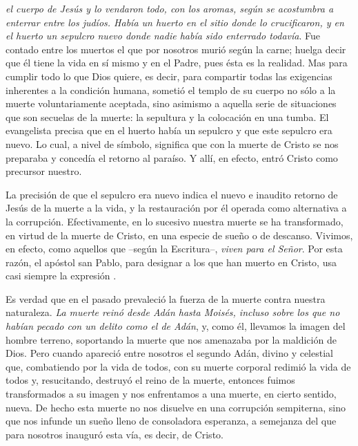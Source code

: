 

\begin{body}
 \textit{el cuerpo de Jesús y lo vendaron todo, con los aromas, según se acostumbra a enterrar entre los judíos. Había un huerto en el sitio donde lo crucificaron, y en el huerto un sepulcro nuevo donde nadie había sido enterrado todavía}. Fue contado entre los muertos el que por nosotros murió según la carne; huelga decir que él tiene la vida en sí mismo y en el Padre, pues ésta es la realidad. Mas para cumplir todo lo que Dios quiere, es decir, para compartir todas las exigencias inherentes a la condición humana, sometió el templo de su cuerpo no sólo a la muerte voluntariamente aceptada, sino asimismo a aquella serie de situaciones que son secuelas de la muerte: la sepultura y la colocación en una tumba. El evangelista precisa que en el huerto había un sepulcro y que este sepulcro era nuevo. Lo cual, a nivel de símbolo, significa que con la muerte de Cristo se nos preparaba y concedía el retorno al paraíso. Y allí, en efecto, entró Cristo como precursor nuestro.

La precisión de que el sepulcro era nuevo indica el nuevo e inaudito retorno de Jesús de la muerte a la vida, y la restauración por él operada como alternativa a la corrupción. Efectivamente, en lo sucesivo nuestra muerte se ha transformado, en virtud de la muerte de Cristo, en una especie de sueño o de descanso. Vivimos, en efecto, como aquellos que –según la Escritura–, \textit{viven para el Señor}. Por esta razón, el apóstol san Pablo, para designar a los que han muerto en Cristo, usa casi siempre la expresión .

Es verdad que en el pasado prevaleció la fuerza de la muerte contra nuestra naturaleza. \textit{La muerte reinó desde Adán hasta Moisés, incluso sobre los que no habían pecado con un delito como el de Adán}, y, como él, llevamos la imagen del hombre terreno, soportando la muerte que nos amenazaba por la maldición de Dios. Pero cuando apareció entre nosotros el segundo Adán, divino y celestial que, combatiendo por la vida de todos, con su muerte corporal redimió la vida de todos y, resucitando, destruyó el reino de la muerte, entonces fuimos transformados a su imagen y nos enfrentamos a una muerte, en cierto sentido, nueva. De hecho esta muerte no nos disuelve en una corrupción sempiterna, sino que nos infunde un sueño lleno de consoladora esperanza, a semejanza del que para nosotros inauguró esta vía, es decir, de Cristo.
\end{body}



